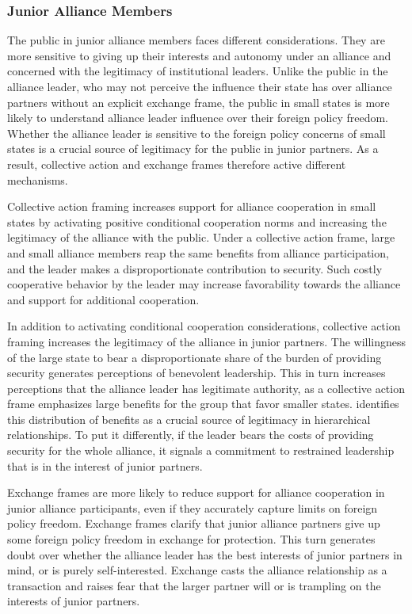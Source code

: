 \documentclass[12pt]{article}
\begin{document}
\subsubsection{Junior Alliance Members} 


The public in junior alliance members faces different considerations.
They are more sensitive to giving up their interests and autonomy under an alliance and concerned with the legitimacy of institutional leaders. 
Unlike the public in the alliance leader, who may not perceive the influence their state has over alliance partners without  an explicit exchange frame, the public in small states is more likely to understand alliance leader influence over their foreign policy freedom. 
Whether the alliance leader is sensitive to the foreign policy concerns of small states is a crucial source of legitimacy for the public in junior partners. 
As a result, collective action and exchange frames therefore active different mechanisms. 


Collective action framing increases support for alliance cooperation in small states by activating positive conditional cooperation norms and increasing the legitimacy of the alliance with the public. 
Under a collective action frame, large and small alliance members reap the same benefits from alliance participation, and the leader makes a disproportionate contribution to security. 
Such costly cooperative behavior by the leader may increase favorability towards the alliance and support for additional cooperation. 


In addition to activating conditional cooperation considerations, collective action framing increases the legitimacy of the alliance in junior partners. 
The willingness of the large state to bear a disproportionate share of the burden of providing security generates perceptions of benevolent leadership.
This in turn increases perceptions that the alliance leader has legitimate authority, as a collective action frame emphasizes large benefits for the group that favor smaller states.
\citet{Lake2013} identifies this distribution of benefits as a crucial source of legitimacy in hierarchical relationships.
To put it differently, if the leader bears the costs of providing security for the whole alliance, it signals a commitment to restrained leadership that is in the interest of junior partners. 


Exchange frames are more likely to reduce support for alliance cooperation in junior alliance participants, even if they accurately capture limits on foreign policy freedom. 
Exchange frames clarify that junior alliance partners give up some foreign policy freedom in exchange for protection. 
This turn generates doubt over whether the alliance leader has the best interests of junior partners in mind, or is purely self-interested. 
Exchange casts the alliance relationship as a transaction and raises fear that the larger partner will or is trampling on the interests of junior partners. 
\end{document}
